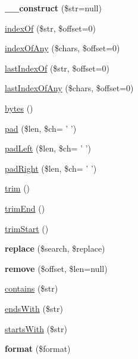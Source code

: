 \begin{DoxyCompactItemize}
\item 
\hypertarget{classString_a0b799cf9b80e4cff537c1f97782f96fd}{
{\bfseries \_\-\_\-construct} (\$str=null)}
\label{classString_a0b799cf9b80e4cff537c1f97782f96fd}

\item 
\hyperlink{classString_a5069041d10f95e4ec9a4be3cd17ab180}{indexOf} (\$str, \$offset=0)
\item 
\hyperlink{classString_a1c8a1df4030974f7ae48f59c1a9dca80}{indexOfAny} (\$chars, \$offset=0)
\item 
\hyperlink{classString_a18806fe790375032e3fb268f649914d7}{lastIndexOf} (\$str, \$offset=0)
\item 
\hyperlink{classString_adbe9cb0e51c46bd16881923a7a3d2e4a}{lastIndexOfAny} (\$chars, \$offset=0)
\item 
\hyperlink{classString_ae7254778c39de64320813d1da9f2f276}{bytes} ()
\item 
\hyperlink{classString_aa8542443a25479d810d0c580680f685d}{pad} (\$len, \$ch= ' ')
\item 
\hyperlink{classString_ae39386e13e0e87cff555bfaea20ce656}{padLeft} (\$len, \$ch= ' ')
\item 
\hyperlink{classString_a8ab0df0a7bbe4d99b84356403abf946f}{padRight} (\$len, \$ch= ' ')
\item 
\hyperlink{classString_ac3a075e35b0f39698230957bc7d0172d}{trim} ()
\item 
\hyperlink{classString_a316e68c5acc7716e4aac01c78a1b5063}{trimEnd} ()
\item 
\hyperlink{classString_a34b1f94648606639f31a7596445ff52e}{trimStart} ()
\item 
\hypertarget{classString_adc4f1d6a5b06b6c610f89131e7b8e403}{
{\bfseries replace} (\$search, \$replace)}
\label{classString_adc4f1d6a5b06b6c610f89131e7b8e403}

\item 
\hypertarget{classString_a0ebde07b97b307aedc7f1f17633b90b1}{
{\bfseries remove} (\$offset, \$len=null)}
\label{classString_a0ebde07b97b307aedc7f1f17633b90b1}

\item 
\hyperlink{classString_a459b87eb0e1fd06e68eb58b18ad11897}{contains} (\$str)
\item 
\hyperlink{classString_aa3256858bec84d6ec1d3b7184725f8bd}{endsWith} (\$str)
\item 
\hyperlink{classString_a0ab7fda4a4bc07fcc3ad0eb94cb96b22}{startsWith} (\$str)
\item 
\hypertarget{classString_a680db6e27d0ad3a50aaf779476402def}{
{\bfseries format} (\$format)}
\label{classString_a680db6e27d0ad3a50aaf779476402def}


\end{DoxyCompactItemize}
